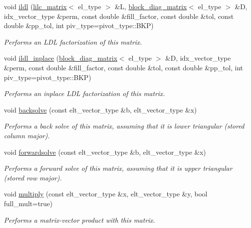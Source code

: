 \begin{DoxyCompactItemize}
void \hyperlink{classlilc__matrix_ab5886c7d465252b8d8981d484b51ab58}{ildl} (\hyperlink{classlilc__matrix}{lilc\+\_\+matrix}$<$ el\+\_\+type $>$ \&L, \hyperlink{classblock__diag__matrix}{block\+\_\+diag\+\_\+matrix}$<$ el\+\_\+type $>$ \&D, idx\+\_\+vector\+\_\+type \&perm, const double \&fill\+\_\+factor, const double \&tol, const double \&pp\+\_\+tol, int piv\+\_\+type=pivot\+\_\+type\+::\+B\+KP)
\begin{DoxyCompactList}\small\item\em Performs an L\+DL\textquotesingle{} factorization of this matrix. \end{DoxyCompactList}\item 
void \hyperlink{classlilc__matrix_aefd39d93fc0df6618f7a59a05661c63e}{ildl\+\_\+inplace} (\hyperlink{classblock__diag__matrix}{block\+\_\+diag\+\_\+matrix}$<$ el\+\_\+type $>$ \&D, idx\+\_\+vector\+\_\+type \&perm, const double \&fill\+\_\+factor, const double \&tol, const double \&pp\+\_\+tol, int piv\+\_\+type=pivot\+\_\+type\+::\+B\+KP)
\begin{DoxyCompactList}\small\item\em Performs an {\itshape inplace} L\+DL\textquotesingle{} factorization of this matrix. \end{DoxyCompactList}\item 
void \hyperlink{classlilc__matrix_a9e0dbfcd1cda4ab3bc067b16f17f7f2f}{backsolve} (const elt\+\_\+vector\+\_\+type \&b, elt\+\_\+vector\+\_\+type \&x)
\begin{DoxyCompactList}\small\item\em Performs a back solve of this matrix, assuming that it is lower triangular (stored column major). \end{DoxyCompactList}\item 
void \hyperlink{classlilc__matrix_afd669063a9594f4d33b01f24bf693edd}{forwardsolve} (const elt\+\_\+vector\+\_\+type \&b, elt\+\_\+vector\+\_\+type \&x)
\begin{DoxyCompactList}\small\item\em Performs a forward solve of this matrix, assuming that it is upper triangular (stored row major). \end{DoxyCompactList}\item 
void \hyperlink{classlilc__matrix_a00362a639b1e8ec341014c39afaf5e5a}{multiply} (const elt\+\_\+vector\+\_\+type \&x, elt\+\_\+vector\+\_\+type \&y, bool full\+\_\+mult=true)
\begin{DoxyCompactList}\small\item\em Performs a matrix-\/vector product with this matrix. \end{DoxyCompactList}\item 

\end{DoxyCompactItemize}
